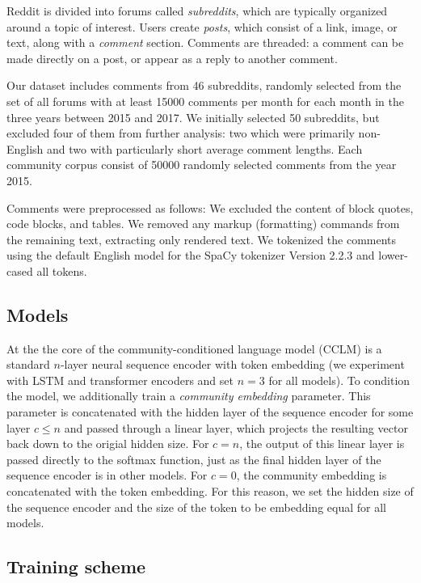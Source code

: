 \documentclass[11pt,a4paper]{article}
\newcommand\jp[1]{\todo[backgroundcolor=blue!10]{JP: #1}}
\begin{document}
Reddit is divided into forums called \textit{subreddits}, 
which are typically organized around a topic of interest. 
Users create \textit{posts}, which consist of a link, image, 
or text, along with a \emph{comment} section. 
Comments are threaded: a comment can be made directly on a post,
or appear as a reply to another comment. 

Our dataset includes comments from \num{46} subreddits, 
randomly selected from the set of all forums 
with at least \num{15000} comments per month for each month
in the three years between 2015 and 2017. 
We initially selected \num{50} subreddits, 
but excluded four of them from further analysis: 
two which were primarily non-English and two with particularly\jp{quantify?} short average comment lengths.
Each community corpus consist of \num{50000} randomly selected comments from the year 2015.

Comments were preprocessed as follows: 
We excluded the content of block quotes, code blocks, and tables.
We removed any markup (formatting) commands from the remaining text, extracting only rendered text.
We tokenized the comments using the default English model for the SpaCy tokenizer Version 2.2.3 \citep{Honnibal2017}
and lower-cased all tokens.

\subsection{Models}

At the the core of the community-conditioned language model (CCLM) 
is a standard $n$-layer neural sequence encoder
with token embedding (we experiment with LSTM and transformer encoders and set $n=3$ for all models).
To condition the model, we additionally train a \emph{community embedding} parameter.
This parameter is concatenated with the hidden layer of the sequence encoder
for some layer $c \leq n$ and passed through a linear layer, 
which projects the resulting vector back down to the origial hidden size.
For $c = n$, the output of this linear layer is passed directly to the softmax function,
just as the final hidden layer of the sequence encoder is in other models.
For $c=0$, the community embedding is concatenated with the token embedding.
For this reason, we set the hidden size of the sequence encoder 
and the size of the token to be embedding equal for all models. 

\subsection{Training scheme}
\end{document}
